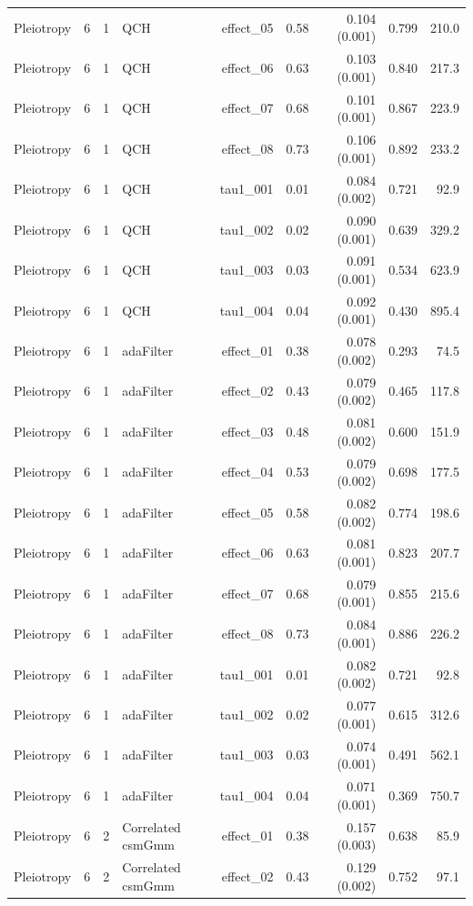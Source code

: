 \begin{longtable}{lcclrrrrr}
Pleiotropy & 6 & 1 & QCH & effect\_05 & 0.58 & 0.104 (0.001) & 0.799 & 210.0\\
Pleiotropy & 6 & 1 & QCH & effect\_06 & 0.63 & 0.103 (0.001) & 0.840 & 217.3\\
Pleiotropy & 6 & 1 & QCH & effect\_07 & 0.68 & 0.101 (0.001) & 0.867 & 223.9\\
Pleiotropy & 6 & 1 & QCH & effect\_08 & 0.73 & 0.106 (0.001) & 0.892 & 233.2\\
Pleiotropy & 6 & 1 & QCH & tau1\_001 & 0.01 & 0.084 (0.002) & 0.721 & 92.9\\
Pleiotropy & 6 & 1 & QCH & tau1\_002 & 0.02 & 0.090 (0.001) & 0.639 & 329.2\\
Pleiotropy & 6 & 1 & QCH & tau1\_003 & 0.03 & 0.091 (0.001) & 0.534 & 623.9\\
Pleiotropy & 6 & 1 & QCH & tau1\_004 & 0.04 & 0.092 (0.001) & 0.430 & 895.4\\
Pleiotropy & 6 & 1 & adaFilter & effect\_01 & 0.38 & 0.078 (0.002) & 0.293 & 74.5\\
Pleiotropy & 6 & 1 & adaFilter & effect\_02 & 0.43 & 0.079 (0.002) & 0.465 & 117.8\\
Pleiotropy & 6 & 1 & adaFilter & effect\_03 & 0.48 & 0.081 (0.002) & 0.600 & 151.9\\
Pleiotropy & 6 & 1 & adaFilter & effect\_04 & 0.53 & 0.079 (0.002) & 0.698 & 177.5\\
Pleiotropy & 6 & 1 & adaFilter & effect\_05 & 0.58 & 0.082 (0.002) & 0.774 & 198.6\\
Pleiotropy & 6 & 1 & adaFilter & effect\_06 & 0.63 & 0.081 (0.001) & 0.823 & 207.7\\
Pleiotropy & 6 & 1 & adaFilter & effect\_07 & 0.68 & 0.079 (0.001) & 0.855 & 215.6\\
Pleiotropy & 6 & 1 & adaFilter & effect\_08 & 0.73 & 0.084 (0.001) & 0.886 & 226.2\\
Pleiotropy & 6 & 1 & adaFilter & tau1\_001 & 0.01 & 0.082 (0.002) & 0.721 & 92.8\\
Pleiotropy & 6 & 1 & adaFilter & tau1\_002 & 0.02 & 0.077 (0.001) & 0.615 & 312.6\\
Pleiotropy & 6 & 1 & adaFilter & tau1\_003 & 0.03 & 0.074 (0.001) & 0.491 & 562.1\\
Pleiotropy & 6 & 1 & adaFilter & tau1\_004 & 0.04 & 0.071 (0.001) & 0.369 & 750.7\\
Pleiotropy & 6 & 2 & Correlated csmGmm & effect\_01 & 0.38 & 0.157 (0.003) & 0.638 & 85.9\\
Pleiotropy & 6 & 2 & Correlated csmGmm & effect\_02 & 0.43 & 0.129 (0.002) & 0.752 & 97.1\\

\end{longtable}
